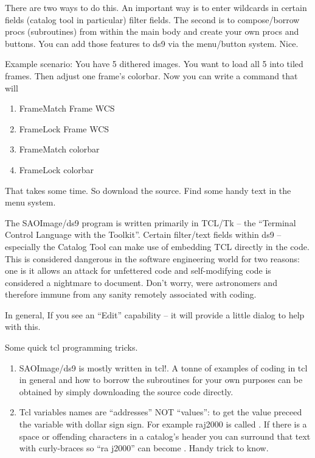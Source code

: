 There are two ways to do this. An important way is to enter wildcards
in certain fields (catalog tool in particular) filter fields. The
second is to compose/borrow procs (subroutines) from within the
main body and create your own procs and buttons. You can add those
features to ds9 via the menu/button system. Nice.

Example scenario: You have 5 dithered images. You want to load
all 5 into tiled frames. Then adjust one frame's colorbar. Now
you can write a command that will

\vspace{-.15cm}
\begin{enumerate}\addtolength{\itemsep}{-0.5\baselineskip}
   \item   Frame\menu Match \menu Frame \menu WCS
   \item   Frame\menu Lock \menu Frame \menu WCS
   \item   Frame\menu Match \menu colorbar
   \item   Frame\menu Lock \menu colorbar
\end{enumerate}


That takes some time. So download the source. Find some handy
text in the menu system.


The SAOImage/ds9 program is written primarily in TCL/Tk -- the
``Terminal Control Language with the Toolkit''. Certain filter/text
fields within ds9 -- especially the Catalog Tool can make use of
embedding TCL directly in the code. This is considered dangerous in
the software engineering world for two reasons: one is it allows an
attack for unfettered code and self-modifying code is considered a
nightmare to document. Don't worry, were astronomers and therefore
immune from any sanity remotely associated with coding.

In general, If you see an ``Edit'' capability -- it will provide
a little dialog to help with this.

Some quick tcl programming tricks.

\vspace{-.15cm}
\begin{enumerate}\addtolength{\itemsep}{-0.5\baselineskip}
\item   SAOImage/ds9 is mostly written in tcl!. A tonne of examples
  of coding in tcl in general and how to borrow the subroutines for
  your own purposes can be obtained by simply downloading the source
  code directly.

   \item   Tcl variables names are ``addresses'' NOT ``values'':
to get the value preceed the variable with dollar sign
{\color{verbcolor}{\verb#$#}} sign. For example raj2000 is called
{\color{verbcolor}{\verb#$raj2000#}}. If there is a space or offending
characters in a catalog's header you can surround that text with
curly-braces {\color{verbcolor}{\verb#{}#}} so ``ra j2000'' can become
{}. Handy trick to know.
\end{enumerate}


